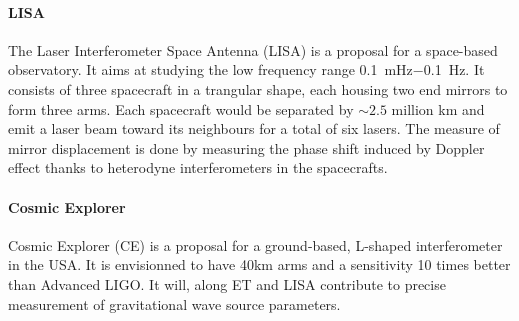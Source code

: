 \paragraph*{LISA}
The Laser Interferometer Space Antenna (LISA) \cite{LISA} is a proposal for a space-based observatory.
It aims at studying the low frequency range \SI{0.1}{\milli\hertz}$-$\SI{0.1}{\hertz}.
It consists of three spacecraft in a trangular shape, each housing two end mirrors to form three arms.
Each spacecraft would be separated by $\sim 2.5$ million \si{km} and emit a laser beam toward its neighbours for a total of six lasers.
The measure of mirror displacement is done by measuring the phase shift induced by Doppler effect thanks to heterodyne interferometers in the spacecrafts.

\paragraph*{Cosmic Explorer}
Cosmic Explorer (CE) is a proposal for a ground-based, L-shaped interferometer in the USA.
It is envisionned to have 40km arms and a sensitivity 10 times better than Advanced LIGO.
It will, along ET and LISA contribute to precise measurement of gravitational wave source parameters.